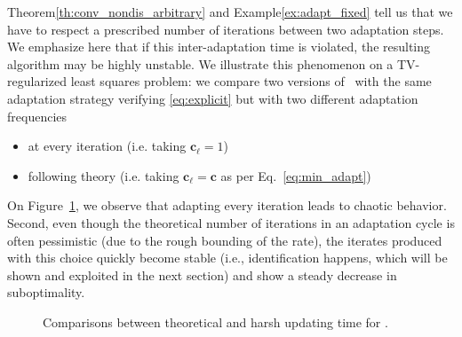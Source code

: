 {
\begin{remark}
Theorem\;\ref{th:conv_nondis_arbitrary} and Example\;\ref{ex:adapt_fixed} tell us that we have to respect a prescribed number of iterations between two adaptation steps. We emphasize here that if this inter-adaptation time is violated, the resulting algorithm may be highly unstable. We illustrate this phenomenon on a TV-regularized least squares problem: we compare two versions of \adaalgo~with the same adaptation strategy verifying 
\eqref{eq:explicit} but with two different adaptation frequencies
\begin{itemize}
    \item at every iteration (i.e. taking $\mathbf{c}_\ell = 1$)
    \item following theory (i.e. taking $\mathbf{c}_\ell = \mathbf{c}$ as per Eq.~\eqref{eq:min_adapt})
\end{itemize}
On Figure~\ref{fig:stab}, we observe that adapting every iteration leads to chaotic behavior. Second, even though the theoretical number of iterations in an adaptation cycle is often pessimistic (due to the rough bounding of the rate), the iterates produced with this choice quickly become stable (i.e., identification happens, which will be shown and exploited in the next section) and show a steady decrease in suboptimality.

\begin{figure}[H]
\begin{center}
 \scalebox{0.9}{}
 \scalebox{0.9}{}
\end{center}
\caption{Comparisons between theoretical and harsh updating time for \adaalgo.}
\label{fig:stab}
\end{figure}

\end{remark}}


